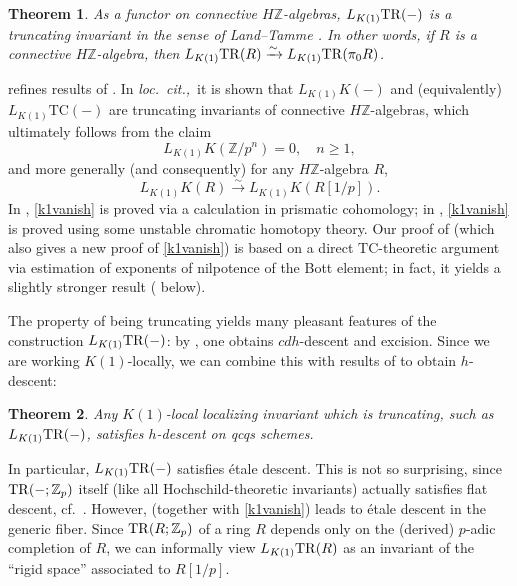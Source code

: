 \documentclass{amsart}
\newtheorem{theorem}{Theorem}[section]
\theoremstyle{definition}
\newcommand{\TC}{\mathrm{TC}}
\begin{document}
\begin{theorem} 
\label{truncatingthmintro}
As a functor on connective $H\mathbb{Z}$-algebras, 
$L_{K(1)} \mathrm{TR}(-)$
is a
truncating invariant in the sense of Land--Tamme \cite{LT19}. In other words, if
$R$ is a connective $H\mathbb{Z}$-algebra, then $L_{K(1) } \mathrm{TR}(R)
\xrightarrow{\sim} L_{K(1)} \mathrm{TR}(\pi_0 R)$. \end{theorem} 


 refines results of \cite{LMT, BCM}. In
\emph{loc.~cit.,}~it
is shown 
that $L_{K(1)} K(-)$ and (equivalently) $L_{K(1)} \TC(-)$ are truncating
invariants of connective
$H\mathbb{Z}$-algebras, which ultimately follows from the claim
\begin{equation} L_{K(1)}
K(\mathbb{Z}/p^n) =0, \quad n \geq 1, \label{k1vanish} \end{equation} 
and more generally (and consequently) for any $H\mathbb{Z}$-algebra $R$,
\begin{equation} 
L_{K(1)} K(R) \xrightarrow{\sim} L_{K(1)} K(R[1/p]). \label{k1invertp}
\end{equation} 
In \cite{BCM}, \eqref{k1vanish} is proved via a calculation in prismatic cohomology; in
\cite{LMT}, \eqref{k1vanish} is proved using some unstable chromatic homotopy theory. 
Our proof of  (which also gives a new proof of
\eqref{k1vanish}) is based on a direct $\TC$-theoretic argument via estimation
of exponents of nilpotence of the Bott element; in fact, it yields a slightly
stronger result ( below). 


The property of being truncating yields many pleasant features of the
construction $L_{K(1)} \mathrm{TR}(-)$: by \cite{LT19}, one obtains $cdh$-descent and
excision. Since we are working $K(1)$-locally, we can combine this with results
of \cite{CMNN} to obtain $h$-descent: 

\begin{theorem} 
\label{hdescintro}
Any $K(1)$-local localizing invariant which is truncating, such as $L_{K(1)}
\mathrm{TR}(-)$, satisfies $h$-descent
on qcqs schemes. 
\end{theorem} 


In particular, 
$L_{K(1)}\mathrm{TR}(-)$ satisfies \'etale descent. This is not so surprising, 
since $\mathrm{TR}(-; \mathbb{Z}_p)$ itself (like all Hochschild-theoretic invariants) actually satisfies
flat descent, cf.~\cite[Sec.~3]{BMS2}. However, 
(together with \eqref{k1vanish}) leads to \'etale descent in the generic fiber. 
Since $\mathrm{TR}(R; \mathbb{Z}_p)$ of a ring $R$  depends only on the (derived)
$p$-adic completion of $R$, we can informally view $L_{K(1)} \mathrm{TR}(R)$ as an invariant of the ``rigid space''
associated to $R[1/p]$. 
\end{document}
